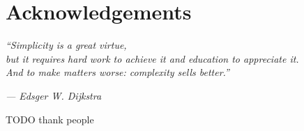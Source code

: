 
 \chapter*{Acknowledgements}

  \emph{``Simplicity is a great virtue,\\
  but it requires hard work to achieve it and education to appreciate it.\\
  And to make matters worse: complexity sells better.''}

  \hfill\emph{--- Edsger W. Dijkstra}

  TODO thank people


